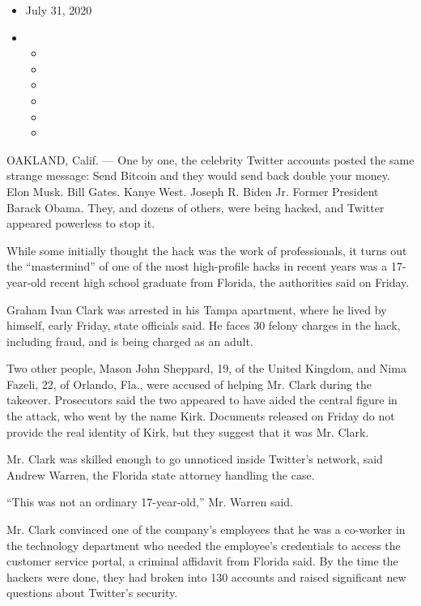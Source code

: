 \begin{itemize}
\item
  July 31, 2020
\item
  \begin{itemize}
  \item
  \item
  \item
  \item
  \item
  \item
  \end{itemize}
\end{itemize}

OAKLAND, Calif. --- One by one, the celebrity Twitter accounts posted
the same strange message: Send Bitcoin and they would send back double
your money. Elon Musk. Bill Gates. Kanye West. Joseph R. Biden Jr.
Former President Barack Obama. They, and dozens of others, were being
hacked, and Twitter appeared powerless to stop it.

While some initially thought the hack was the work of professionals, it
turns out the ``mastermind'' of one of the most high-profile hacks in
recent years was a 17-year-old recent high school graduate from Florida,
the authorities said on Friday.

Graham Ivan Clark was arrested in his Tampa apartment, where he lived by
himself, early Friday, state officials said. He faces 30 felony charges
in the hack, including fraud, and is being charged as an adult.

Two other people, Mason John Sheppard, 19, of the United Kingdom, and
Nima Fazeli, 22, of Orlando, Fla., were accused of helping Mr. Clark
during the takeover. Prosecutors said the two appeared to have aided the
central figure in the attack, who went by the name Kirk. Documents
released on Friday do not provide the real identity of Kirk, but they
suggest that it was Mr. Clark.

Mr. Clark was skilled enough to go unnoticed inside Twitter's network,
said Andrew Warren, the Florida state attorney handling the case.

``This was not an ordinary 17-year-old,'' Mr. Warren said.

Mr. Clark convinced one of the company's employees that he was a
co-worker in the technology department who needed the employee's
credentials to access the customer service portal, a criminal affidavit
from Florida said. By the time the hackers were done, they had broken
into 130 accounts and raised significant new questions about Twitter's
security.

